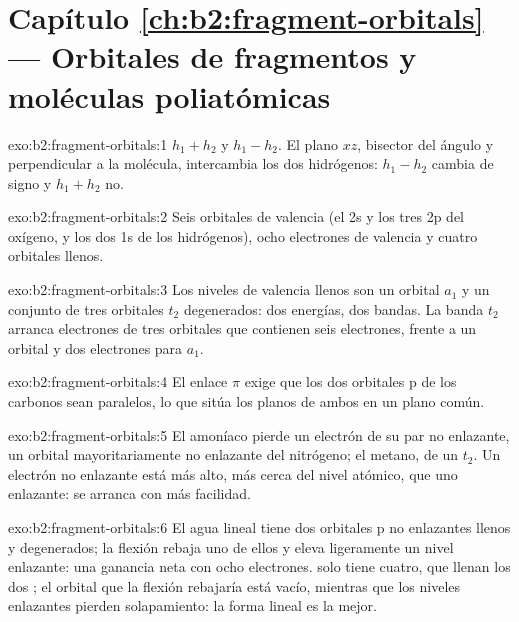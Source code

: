 \section*{Capítulo \ref{ch:b2:fragment-orbitals} --- Orbitales de fragmentos y moléculas poliatómicas}

\begin{solution}{exo:b2:fragment-orbitals:1}
$h_1 + h_2$ y $h_1 - h_2$. El plano $xz$, bisector del ángulo y
perpendicular a la molécula, intercambia los dos hidrógenos: $h_1 - h_2$ cambia de
signo y $h_1 + h_2$ no.
\end{solution}

\begin{solution}{exo:b2:fragment-orbitals:2}
Seis orbitales de valencia (el 2s y los tres 2p del oxígeno, y los dos 1s de los hidrógenos), ocho electrones
de valencia y cuatro orbitales llenos.
\end{solution}

\begin{solution}{exo:b2:fragment-orbitals:3}
Los niveles de valencia llenos son un orbital $a_1$ y un conjunto de tres orbitales $t_2$
degenerados: dos energías, dos bandas. La banda $t_2$ arranca electrones de tres
orbitales que contienen seis electrones, frente a un orbital y dos electrones para $a_1$.
\end{solution}

\begin{solution}{exo:b2:fragment-orbitals:4}
El enlace $\pi$ exige que los dos orbitales p de los carbonos sean paralelos, lo que sitúa
los planos de ambos  en un plano común.
\end{solution}

\begin{solution}{exo:b2:fragment-orbitals:5}
El amoníaco pierde un electrón de su par no enlazante, un orbital mayoritariamente no enlazante del
nitrógeno; el metano, de un  $t_2$. Un electrón no enlazante está más alto,
más cerca del nivel atómico, que uno enlazante: se arranca con más facilidad.
\end{solution}

\begin{solution}{exo:b2:fragment-orbitals:6}
El agua lineal tiene dos orbitales p no enlazantes llenos y degenerados; la flexión rebaja uno de
ellos y eleva ligeramente un nivel enlazante: una ganancia neta con ocho electrones. 
solo tiene cuatro, que llenan los dos ; el orbital que la flexión
rebajaría está vacío, mientras que los niveles enlazantes pierden solapamiento: la forma lineal es la mejor.
\end{solution}

